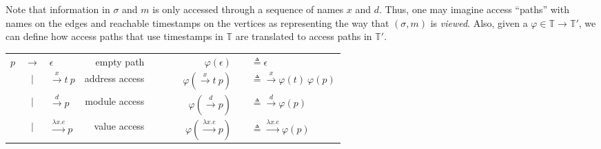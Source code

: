 \documentclass[acmsmall,screen,review]{acmart}\settopmatter{printfolios=true,printccs=false,printacmref=false}
\theoremstyle{acmdefinition}
\newcommand*{\modid}{d}
\newcommand*{\Time}{\mathbb{T}}
\newcommand*{\ctx}{\sigma}
\newcommand*{\mem}{m}
\begin{document}
Note that information in $\ctx$ and $\mem$ is only accessed through a sequence of names $x$ and $\modid$.
Thus, one may imagine access ``paths'' with names on the edges and reachable timestamps on the vertices as representing the way that $(\ctx,\mem)$ is \emph{viewed}.
Also, given a $\varphi\in\Time\rightarrow\Time'$, we can define how access paths that use timestamps in $\Time$ are translated to access paths in $\Time'$.
\begin{center}
  \begin{tabular}{rclrcrcl}
    $p$ & $\rightarrow$ & $\epsilon$                   & empty path     & $\qquad$ & $\varphi(\epsilon)$                   & \hspace{-2em} & $\triangleq\epsilon$                              \\
        & $|$           & $\xrightarrow{x}t\:p$        & address access & $\qquad$ & $\varphi(\xrightarrow{x}t\:p)$        & \hspace{-2em} & $\triangleq\xrightarrow{x}\varphi(t)\:\varphi(p)$ \\
        & $|$           & $\xrightarrow{\modid}p$      & module access  & $\qquad$ & $\varphi(\xrightarrow{\modid}p)$      & \hspace{-2em} & $\triangleq\xrightarrow{\modid}\varphi(p)$        \\
        & $|$           & $\xrightarrow{\lambda x.e}p$ & value access   & $\qquad$ & $\varphi(\xrightarrow{\lambda x.e}p)$ & \hspace{-2em} & $\triangleq\xrightarrow{\lambda x.e}\varphi(p)$
  \end{tabular}
\end{center}
\end{document}
